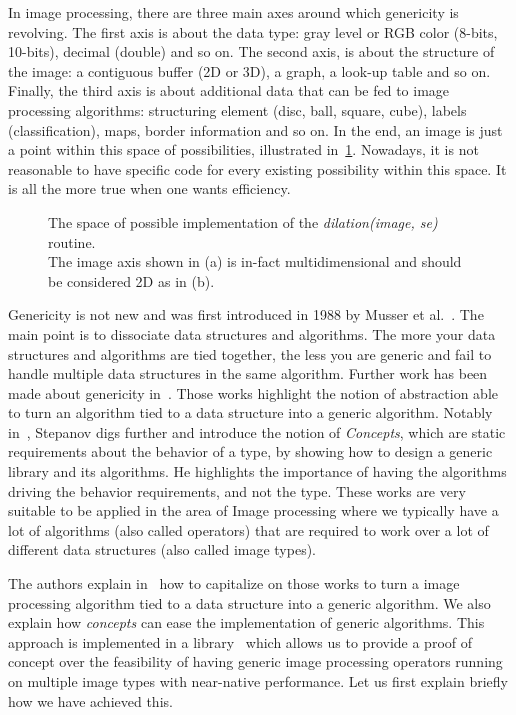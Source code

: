In image processing, there are three main axes around which genericity is revolving. The first axis is about the data
type: gray level or RGB color (8-bits, 10-bits), decimal (double) and so on. The second axis, is about the structure of
the image: a contiguous buffer (2D or 3D), a graph, a look-up table and so on. Finally, the third axis is about
additional data that can be fed to image processing algorithms: structuring element (disc, ball, square, cube), labels
(classification), maps, border information and so on. In the end, an image is just a point within this space of
possibilities, illustrated in~\cref{fig:gen.espaceSAV}. Nowadays, it is not reasonable to have specific code for every
existing possibility within this space. It is all the more true when one wants efficiency.

\begin{figure}[htbp]
  \centering
  \subfloat[]{}
  \hfil
  \subfloat[]{}
  \caption{The space of possible implementation of the \emph{dilation(image, se)} routine.\\
    The image axis shown in (a) is in-fact multidimensional and should be considered 2D as in (b).}
  \label{fig:gen.espaceSAV}
\end{figure}

Genericity is not new and was first introduced in 1988 by Musser et al.~\parencite{musser.1988.generic}. The main point
is to dissociate data structures and algorithms. The more your data structures and algorithms are tied together, the
less you are generic and fail to handle multiple data structures in the same algorithm. Further work has been
made about genericity in~\parencite{musser.1994.algorithm,dehnert.1998.fundamentals}. Those works highlight the notion
of abstraction able to turn an algorithm tied to a data structure into a generic algorithm. Notably
in~\parencite{stepanov.2009.elements}, Stepanov digs further and introduce the notion of \emph{Concepts}, which are
static requirements about the behavior of a type, by showing how to design a generic library and its algorithms. He
highlights the importance of having the algorithms driving the behavior requirements, and not the type. These works
are very suitable to be applied in the area of Image processing where we typically have a lot of algorithms (also called
operators) that are required to work over a lot of different data structures (also called image types).

The authors explain in~\parencite{roynard.2019.rrpr} how to capitalize on those works to turn a image processing
algorithm tied to a data structure into a generic algorithm. We also explain how \emph{concepts} can ease the
implementation of generic algorithms. This approach is implemented in a library~\parencite{carlinet.2018.pylene} which
allows us to provide a proof of concept over the feasibility of having generic image processing operators running on
multiple image types with near-native performance. Let us first explain briefly how we have achieved this.

